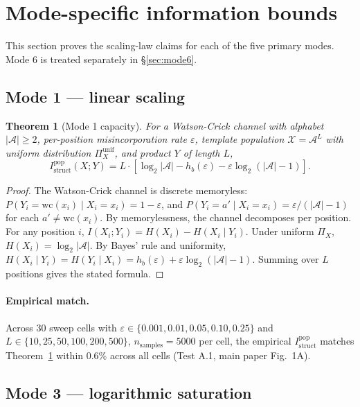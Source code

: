 \documentclass[11pt]{article}
\theoremstyle{plain}
\newtheorem{theorem}{Theorem}
\theoremstyle{definition}
\newcommand{\Istructpop}{I_{\mathrm{struct}}^{\mathrm{pop}}}
\newcommand{\Hbin}{h_b}
\begin{document}
\section{Mode-specific information bounds}

This section proves the scaling-law claims for each of the five primary modes. Mode 6 is treated separately in \S\ref{sec:mode6}.

\subsection{Mode 1 --- linear scaling}

\begin{theorem}[Mode 1 capacity]
\label{thm:mode1}
For a Watson-Crick channel with alphabet $|\mathcal{A}| \ge 2$, per-position misincorporation rate $\varepsilon$, template population $\mathcal{X} = \mathcal{A}^L$ with uniform distribution $\Pi_X^{\mathrm{unif}}$, and product $Y$ of length $L$,
\[
\Istructpop(X; Y) = L \cdot \left[\log_2 |\mathcal{A}| - \Hbin(\varepsilon) - \varepsilon \log_2 (|\mathcal{A}| - 1)\right].
\]
\end{theorem}

\begin{proof}
The Watson-Crick channel is discrete memoryless: $P(Y_i = \mathrm{wc}(x_i) \mid X_i = x_i) = 1 - \varepsilon$, and $P(Y_i = a' \mid X_i = x_i) = \varepsilon / (|\mathcal{A}| - 1)$ for each $a' \neq \mathrm{wc}(x_i)$. By memorylessness, the channel decomposes per position. For any position $i$, $I(X_i; Y_i) = H(X_i) - H(X_i \mid Y_i)$. Under uniform $\Pi_X$, $H(X_i) = \log_2 |\mathcal{A}|$. By Bayes' rule and uniformity, $H(X_i \mid Y_i) = H(Y_i \mid X_i) = \Hbin(\varepsilon) + \varepsilon \log_2 (|\mathcal{A}| - 1)$. Summing over $L$ positions gives the stated formula.
\end{proof}

\paragraph{Empirical match.} Across 30 sweep cells with $\varepsilon \in \{0.001, 0.01, 0.05, 0.10, 0.25\}$ and $L \in \{10, 25, 50, 100, 200, 500\}$, $n_{\mathrm{samples}} = 5000$ per cell, the empirical $\Istructpop$ matches Theorem~\ref{thm:mode1} within 0.6\% across all cells (Test A.1, main paper Fig.~1A).

\subsection{Mode 3 --- logarithmic saturation}
\end{document}
